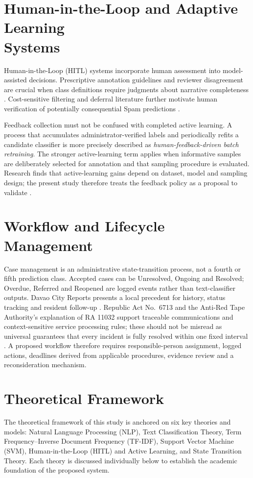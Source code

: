 \section[Human-in-the-Loop and Adaptive Learning Systems]{Human-in-the-Loop and Adaptive Learning\protect\\ Systems}
Human-in-the-Loop (HITL) systems incorporate human assessment into model-assisted decisions. Prescriptive annotation guidelines and reviewer disagreement are crucial when class definitions require judgments about narrative completeness \cite{rottger2022,fleisig2024}. Cost-sensitive filtering and deferral literature further motivate human verification of potentially consequential Spam predictions \cite{madras2018,franc2023}.

Feedback collection must not be confused with completed active learning. A process that accumulates administrator-verified labels and periodically refits a candidate classifier is more precisely described as \emph{human-feedback-driven batch retraining}. The stronger active-learning term applies when informative samples are deliberately selected for annotation and that sampling procedure is evaluated. Research finds that active-learning gains depend on dataset, model and sampling design; the present study therefore treats the feedback policy as a proposal to validate \cite{ghose2024,beatty2018}.

\section{Workflow and Lifecycle Management}
Case management is an administrative state-transition process, not a fourth or fifth prediction class. Accepted cases can be Unresolved, Ongoing and Resolved; Overdue, Referred and Reopened are logged events rather than text-classifier outputs. Davao City Reports presents a local precedent for history, status tracking and resident follow-up \cite{dcr}. Republic Act No.~6713 and the Anti-Red Tape Authority's explanation of RA 11032 support traceable communications and context-sensitive service processing rules; these should not be misread as universal guarantees that every incident is fully resolved within one fixed interval \cite{ra6713,ra11032}. A proposed workflow therefore requires responsible-person assignment, logged actions, deadlines derived from applicable procedures, evidence review and a reconsideration mechanism.

\section{Theoretical Framework}
The theoretical framework of this study is anchored on six key theories and models: Natural Language Processing (NLP), Text Classification Theory, Term Frequency--Inverse Document Frequency (TF-IDF), Support Vector Machine (SVM), Human-in-the-Loop (HITL) and Active Learning, and State Transition Theory. Each theory is discussed individually below to establish the academic foundation of the proposed system.

